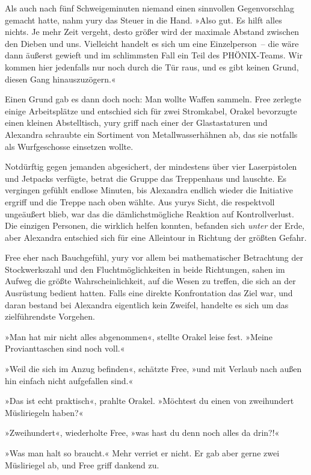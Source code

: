 Als auch nach fünf Schweigeminuten niemand einen sinnvollen Gegenvorschlag gemacht hatte, nahm yury das Steuer in die Hand. »Also gut. Es hilft alles nichts. Je mehr Zeit vergeht, desto größer wird der maximale Abstand zwischen den Dieben und uns. Vielleicht handelt es sich um eine Einzelperson~– die wäre dann äußerst gewieft und im schlimmsten Fall ein Teil des PHÖNIX-Teams. Wir kommen hier jedenfalls nur noch durch die Tür raus, und es gibt keinen Grund, diesen Gang hinauszuzögern.«

Einen Grund gab es dann doch noch: Man wollte Waffen sammeln. Free zerlegte einige Arbeitsplätze und entschied sich für zwei Stromkabel, Orakel bevorzugte einen kleinen Abstelltisch, yury griff nach einer der Glastastaturen und Alexandra schraubte ein Sortiment von Metallwasserhähnen ab, das sie notfalls als Wurfgeschosse einsetzen wollte.

Notdürftig gegen jemanden abgesichert, der mindestens über vier Laserpistolen und Jetpacks verfügte, betrat die Gruppe das Treppenhaus und lauschte. Es vergingen gefühlt endlose Minuten, bis Alexandra endlich wieder die Initiative ergriff und die Treppe nach oben wählte. Aus yurys Sicht, die respektvoll ungeäußert blieb, war das die dämlichstmögliche Reaktion auf Kontrollverlust. Die einzigen Personen, die wirklich helfen konnten, befanden sich \emph{unter} der Erde, aber Alexandra entschied sich für eine Alleintour in Richtung der größten Gefahr.

Free eher nach Bauchgefühl, yury vor allem bei mathematischer Betrachtung der Stockwerkszahl und den Fluchtmöglichkeiten in beide Richtungen, sahen im Aufweg die größte Wahrscheinlichkeit, auf die Wesen zu treffen, die sich an der Ausrüstung bedient hatten. Falls eine direkte Konfrontation das Ziel war, und daran bestand bei Alexandra eigentlich kein Zweifel, handelte es sich um das zielführendste Vorgehen.

»Man hat mir nicht alles abgenommen«, stellte Orakel leise fest. »Meine Provianttaschen sind noch voll.«

»Weil die sich im Anzug befinden«, schätzte Free, »und mit Verlaub nach außen hin einfach nicht aufgefallen sind.«

»Das ist echt praktisch«, prahlte Orakel. »Möchtest du einen von zweihundert Müsliriegeln haben?«

»Zweihundert«, wiederholte Free, »was hast du denn noch alles da drin?!«

»Was man halt so braucht.« Mehr verriet er nicht. Er gab aber gerne zwei Müsliriegel ab, und Free griff dankend zu.



